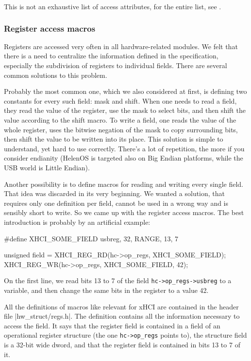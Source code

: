 This is not an exhaustive list of access attributes, for the entire list, see .

\subsubsection{Register access macros}

Registers are accessed very often in all hardware-related modules. We felt that
there is a need to centralize the information defined in the specification,
especially the subdivision of registers to individual fields. There are several
common solutions to this problem.

Probably the most common one, which we also considered at first, is defining
two constants for every such field: mask and shift. When one needs to read
a field, they read the value of the register, use the mask to select bits, and
then shift the value according to the shift macro. To write a field, one reads
the value of the whole register, uses the bitwise negation of the mask to copy
surrounding bits, then shift the value to be written into its place. This
solution is simple to understand, yet hard to use correctly. There's a lot of
repetition, the more if you consider endianity (HelenOS is targeted also on Big
Endian platforms, while the USB world is Little Endian).

Another possibility is to define macros for reading and writing every single
field. That idea was discarded in its very beginning. We wanted a solution,
that requires only one definition per field, cannot be used in a wrong way and
is sensibly short to write. So we came up with the register access macros. The
best introduction is probably by an artificial example:

\begin{listing}[h]
\begin{code}
#define XHCI_SOME_FIELD            usbreg, 32, RANGE, 13, 7

unsigned field = XHCI_REG_RD(hc->op_regs, XHCI_SOME_FIELD);
XHCI_REG_WR(hc->op_regs, XHCI_SOME_FIELD, 42);
\end{code}
	\caption[An example of using register macros]{On the first line, we read
	bits 13 to 7 of the field \texttt{hc->op_regs->usbreg} to
	a variable, and then change the same bits in the register to a value 42.}
\end{listing}

All the definitions of macros like  relevant for xHCI
are contained in the header file \header|hw_struct/regs.h|. The definition
contains all the information necessary to access the field. It says that the
register field is contained in a field  of an operational
register structure (the one \texttt{hc->op_regs} points to), the
structure field is a 32-bit wide dword, and that the register field is
contained in bits 13 to 7 of it.

